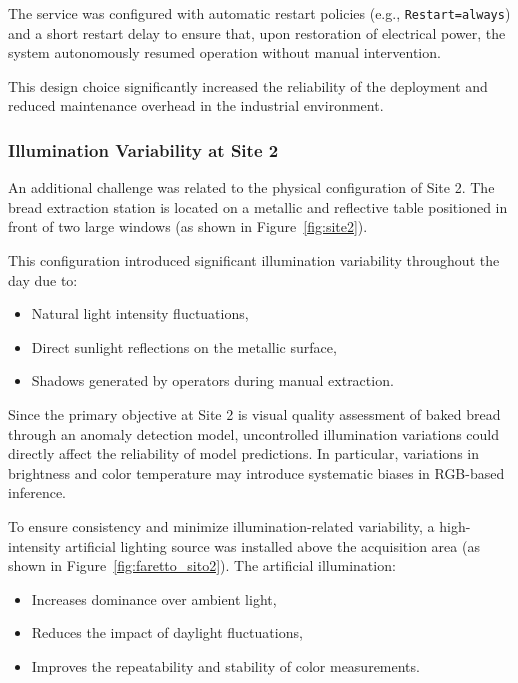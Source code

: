 The service was configured with automatic restart policies (e.g., \texttt{Restart=always}) and a short restart delay to ensure that, upon restoration of electrical power, the system autonomously resumed operation without manual intervention.

This design choice significantly increased the reliability of the deployment and reduced maintenance overhead in the industrial environment.

\subsubsection{Illumination Variability at Site 2}

An additional challenge was related to the physical configuration of Site 2. The bread extraction station is located on a metallic and reflective table positioned in front of two large windows (as shown in Figure~\ref{fig:site2}).

This configuration introduced significant illumination variability throughout the day due to:

\begin{itemize}
    \item Natural light intensity fluctuations,
    \item Direct sunlight reflections on the metallic surface,
    \item Shadows generated by operators during manual extraction.
\end{itemize}

Since the primary objective at Site 2 is visual quality assessment of baked bread through an anomaly detection model, uncontrolled illumination variations could directly affect the reliability of model predictions. In particular, variations in brightness and color temperature may introduce systematic biases in RGB-based inference.\cite{hoang_image-based_2025,kuhlechner_object_2025}

To ensure consistency and minimize illumination-related variability, a high-intensity artificial lighting source was installed above the acquisition area (as shown in Figure~\ref{fig:faretto_sito2}).
\newline
The artificial illumination:

\begin{itemize}
    \item Increases dominance over ambient light,
    \item Reduces the impact of daylight fluctuations,
    \item Improves the repeatability and stability of color measurements.
\end{itemize}

